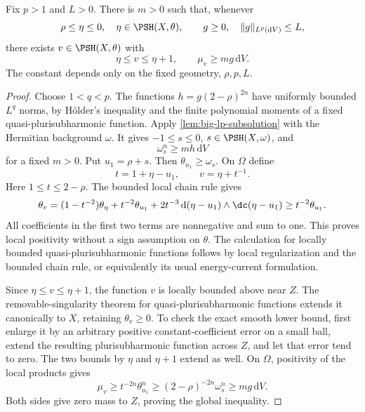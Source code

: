 \begin{lemma}\label{lem:big-reference-subsolution}
Fix $p>1$ and $L>0$. There is $m>0$ such that, whenever
\[
 \rho\leq\eta\leq0,\quad\eta\in\PSH(X,\theta),
 \qquad g\geq0,\quad\|g\|_{L^p(\mathrm{d}V)}\leq L,
\]
there exists $v\in\PSH(X,\theta)$ with
\[
 \eta\leq v\leq\eta+1,\qquad
 \mu_v\geq m g\,\mathrm{d}V.
\]
The constant depends only on the fixed geometry, $\rho,p,L$.
\end{lemma}
\begin{proof}
Choose $1<q<p$. The functions $h=g(2-\rho)^{2n}$ have uniformly bounded $L^q$ norms, by H\"older's inequality and the finite polynomial moments of a fixed quasi-plurisubharmonic function. Apply \cref{lem:big-lp-subsolution} with the Hermitian background $\omega$. It gives $-1\leq s\leq0$, $s\in\PSH(X,\omega)$, and
\[
 \omega_s^n\geq m h\,\mathrm{d}V
\]
for a fixed $m>0$. Put $u_1=\rho+s$. Then $\theta_{u_1}\geq\omega_s$. On $\Omega$ define
\[
 t=1+\eta-u_1,\qquad v=\eta+t^{-1}.
\]
Here $1\leq t\leq2-\rho$. The bounded local chain rule gives
\[
 \theta_v=(1-t^{-2})\theta_\eta+t^{-2}\theta_{u_1}
       +2t^{-3}\,\mathrm{d}(\eta-u_1)\wedge\dc(\eta-u_1)
 \geq t^{-2}\theta_{u_1}.
\]
All coefficients in the first two terms are nonnegative and sum to one. This proves local positivity without a sign assumption on $\theta$. The calculation for locally bounded quasi-plurisubharmonic functions follows by local regularization and the bounded chain rule, or equivalently its usual energy-current formulation.

Since $\eta\leq v\leq\eta+1$, the function $v$ is locally bounded above near $Z$. The removable-singularity theorem for quasi-plurisubharmonic functions extends it canonically to $X$, retaining $\theta_v\geq0$. To check the exact smooth lower bound, first enlarge it by an arbitrary positive constant-coefficient error on a small ball, extend the resulting plurisubharmonic function across $Z$, and let that error tend to zero. The two bounds by $\eta$ and $\eta+1$ extend as well. On $\Omega$, positivity of the local products gives
\[
 \mu_v\geq t^{-2n}\theta_{u_1}^n
       \geq(2-\rho)^{-2n}\omega_s^n
       \geq m g\,\mathrm{d}V.
\]
Both sides give zero mass to $Z$, proving the global inequality.
\end{proof}

